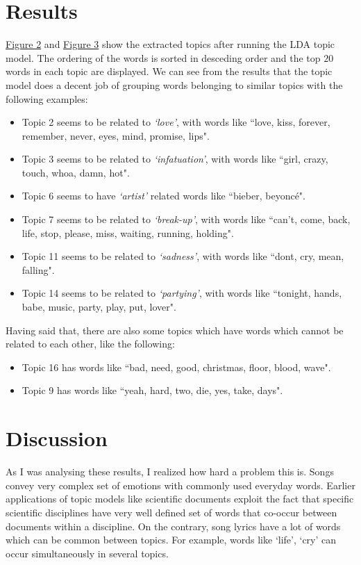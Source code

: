\documentclass{article}
\begin{document}
  \section{Results}
  \href{fig:t1Fig}{Figure 2} and \href{fig:t2Fig}{Figure 3} show the extracted topics after running the LDA topic model. The ordering of the words is sorted in desceding order and the top $20$ words in each topic are displayed. We can see from the results that the topic model does a decent job of grouping words belonging to similar topics with the following examples:
  \begin{itemize}
    \item Topic 2 seems to be related to \emph{`love'}, with words like ``love, kiss, forever, remember, never, eyes, mind, promise, lips".
    \item Topic 3 seems to be related to \emph{`infatuation'}, with words like ``girl, crazy, touch, whoa, damn, hot".
    \item Topic 6 seems to have \emph{`artist'} related words like ``bieber, beyonc\'e".
    \item Topic 7 seems to be related to \emph{`break-up'}, with words like ``can't, come, back, life, stop, please, miss, waiting, running, holding".
    \item Topic 11 seems to be related to \emph{`sadness'}, with words like ``dont, cry, mean, falling".
    \item Topic 14 seems to be related to \emph{`partying'}, with words like ``tonight, hands, babe, music, party, play, put, lover".
  \end{itemize}
  Having said that, there are also some topics which have words which cannot be related to each other, like the following:
  \begin{itemize}
    \item Topic 16 has words like ``bad, need, good, christmas, floor, blood, wave".
    \item Topic 9 has words like ``yeah, hard, two, die, yes, take, days".
  \end{itemize}
  \section{Discussion}
  As I was analysing these results, I realized how hard a problem this is. Songs convey very complex set of emotions with commonly used everyday words. Earlier applications of topic models like scientific documents exploit the fact that specific scientific disciplines have very well defined set of words that co-occur between documents within a discipline. On the contrary, song lyrics have a lot of words which can be common between topics. For example, words like `life', `cry' can occur simultaneously in several topics.
\end{document}
